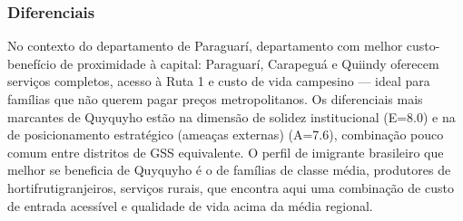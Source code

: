 \subsubsection*{Diferenciais}\label{dif-quyquyho-0911}
No contexto do departamento de Paraguarí, departamento com melhor custo-benefício de proximidade à capital: Paraguarí, Carapeguá e Quiindy oferecem serviços completos, acesso à Ruta 1 e custo de vida campesino — ideal para famílias que não querem pagar preços metropolitanos. Os diferenciais mais marcantes de Quyquyho estão na dimensão de solidez institucional (E=8.0) e na de posicionamento estratégico (ameaças externas) (A=7.6), combinação pouco comum entre distritos de GSS equivalente. O perfil de imigrante brasileiro que melhor se beneficia de Quyquyho é o de famílias de classe média, produtores de hortifrutigranjeiros, serviços rurais, que encontra aqui uma combinação de custo de entrada acessível e qualidade de vida acima da média regional.

